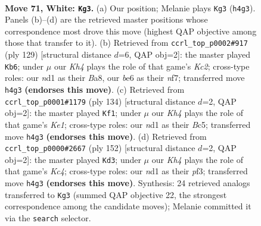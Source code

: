 \documentclass[11pt]{article}
\begin{document}
\clearpage

\begin{figure}[p]\centering
\begin{subfigure}{0.46\textwidth}\centering
\resizebox{\linewidth}{!}{%
\newchessgame
\chessboard[
  setfen={3k4/8/4b3/P7/1P5K/8/8/3n4 w - - 8 71},
  showmover=false,
  pgfstyle=straightmove, color=movearrow, markmove={h4-g3}
]}
\caption{}
\end{subfigure}\hfill
\begin{subfigure}{0.46\textwidth}\centering
\resizebox{\linewidth}{!}{%
\newchessgame
\chessboard[
  setfen={b7/2k2N2/8/6p1/7p/8/8/6K1 b - - 1 65},
  showmover=false,
  pgfstyle=straightmove, color=movearrow, markmove={c7-b6}
]}
\caption{}
\end{subfigure}
\\[4pt]
\begin{subfigure}{0.46\textwidth}\centering
\resizebox{\linewidth}{!}{%
\newchessgame
\chessboard[
  setfen={8/8/5k2/2B5/8/1P3b2/P7/4K3 w - - 9 68},
  showmover=false,
  pgfstyle=straightmove, color=movearrow, markmove={e1-f1}
]}
\caption{}
\end{subfigure}\hfill
\begin{subfigure}{0.46\textwidth}\centering
\resizebox{\linewidth}{!}{%
\newchessgame
\chessboard[
  setfen={8/8/1P6/P3b1k1/2K5/5p2/8/8 w - - 0 77},
  showmover=false,
  pgfstyle=straightmove, color=movearrow, markmove={c4-d3}
]}
\caption{}
\end{subfigure}
\caption{\textbf{Move 71, White: \texttt{Kg3}.} (a) Our position; Melanie plays \texttt{Kg3} (\texttt{h4g3}). Panels (b)--(d) are the retrieved master positions whose correspondence most drove this move (highest QAP objective among those that transfer to it). (b) Retrieved from \texttt{ccrl\_top\_p0002\#917} (ply 129) [structural distance $d$=6, QAP obj=2]: the master played \texttt{Kb6}; under $\mu$ our \emph{Kh4} plays the role of that game's \emph{Kc2}; cross-type roles: our \emph{n}d1 as their \emph{B}a8, our \emph{b}e6 as their \emph{n}f7; transferred move \texttt{h4g3} \textbf{(endorses this move)}. (c) Retrieved from \texttt{ccrl\_top\_p0001\#1179} (ply 134) [structural distance $d$=2, QAP obj=2]: the master played \texttt{Kf1}; under $\mu$ our \emph{Kh4} plays the role of that game's \emph{Ke1}; cross-type roles: our \emph{n}d1 as their \emph{B}c5; transferred move \texttt{h4g3} \textbf{(endorses this move)}. (d) Retrieved from \texttt{ccrl\_top\_p0000\#2667} (ply 152) [structural distance $d$=2, QAP obj=2]: the master played \texttt{Kd3}; under $\mu$ our \emph{Kh4} plays the role of that game's \emph{Kc4}; cross-type roles: our \emph{n}d1 as their \emph{p}f3; transferred move \texttt{h4g3} \textbf{(endorses this move)}. Synthesis: 24 retrieved analogs transferred to \texttt{Kg3} (summed QAP objective 22, the strongest correspondence among the candidate moves); Melanie committed it via the \texttt{search} selector.}
\label{fig:thought-m140}
\end{figure}
\end{document}
